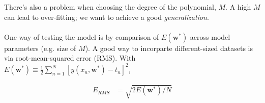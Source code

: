 \documentclass{article}
\begin{document}
There's also a problem when choosing the degree of the polynomial, $M$. A high $M$ can lead to over-fitting; we want to achieve a good \emph{generalization}.
\\\\
One way of testing the model is by comparison of $E(\mathbf{w}^*)$ across model parameters (e.g. size of $M$). A good way to incorparte different-sized datasets is via root-mean-squared error (RMS). With $E(\mathbf{w}^*) \equiv \frac{1}{2}\sum_{n=1}^N [y(x_n, \mathbf{w}^*) - t_n]^2$,

\begin{align}
    E_{RMS} &= \sqrt{2E(\mathbf{w}^*)/N}
\end{align}
\end{document}
